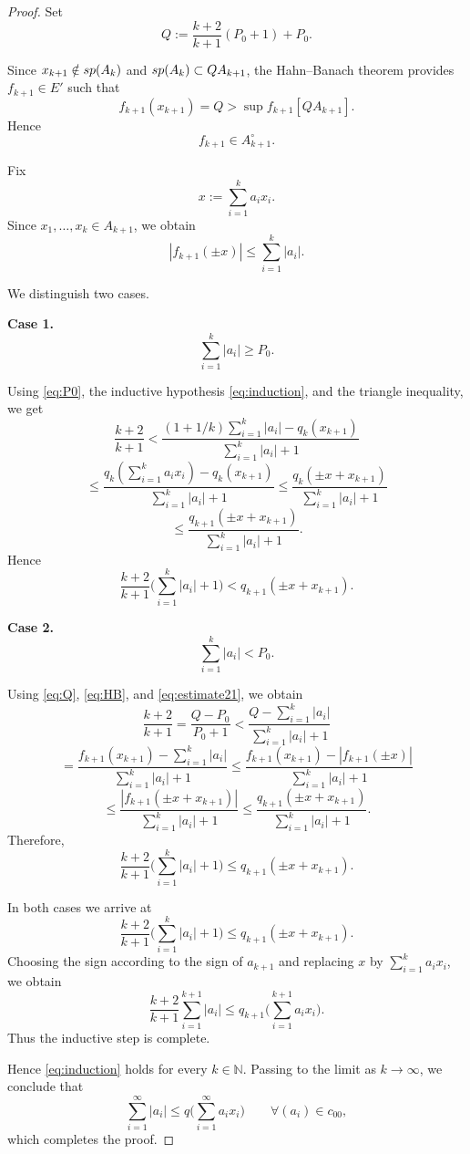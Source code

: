 \documentclass[10pt,a4paper]{amsart}
\begin{document}
\begin{proof}
Set
\begin{equation}\label{eq:Q}
Q:=
\frac{k+2}{k+1}(P_0+1)+P_0.
\end{equation}

Since
$x_{k+1}\notin {\rm sp}(A_k)$
and
${\rm sp}(A_k)\subset QA_{k+1}$,
the Hahn--Banach theorem provides
$f_{k+1}\in E'$
such that
\begin{equation}\label{eq:HB}
f_{k+1}(x_{k+1})=Q
>
\sup f_{k+1}[QA_{k+1}].
\end{equation}
Hence
\[
f_{k+1}\in A_{k+1}^\circ.
\]

Fix
\[
x:=\sum_{i=1}^{k}a_ix_i .
\]
Since
$x_1,\ldots,x_k\in A_{k+1}$,
we obtain
\begin{equation}\label{eq:estimate21}
|f_{k+1}(\pm x)|
\le
\sum_{i=1}^{k}|a_i|.
\end{equation}

We distinguish two cases.

\medskip

\noindent
{\bf Case 1.}
\[
\sum_{i=1}^{k}|a_i|\ge P_0.
\]

Using \eqref{eq:P0}, the inductive hypothesis
\eqref{eq:induction}, and the triangle inequality, we get
\[
\frac{k+2}{k+1}
<
\frac{(1+1/k)\sum_{i=1}^{k}|a_i|-q_k(x_{k+1})}
     {\sum_{i=1}^{k}|a_i|+1}
\]
\[
\le
\frac{
q_k\!\left(\sum_{i=1}^{k}a_ix_i\right)-q_k(x_{k+1})
}{
\sum_{i=1}^{k}|a_i|+1
}
\le
\frac{
q_k(\pm x+x_{k+1})
}{
\sum_{i=1}^{k}|a_i|+1
}
\]
\[
\le
\frac{
q_{k+1}(\pm x+x_{k+1})
}{
\sum_{i=1}^{k}|a_i|+1
}.
\]
Hence
\begin{equation}\label{eq:case1}
\frac{k+2}{k+1}
\Big(
\sum_{i=1}^{k}|a_i|+1
\Big)
<
q_{k+1}(\pm x+x_{k+1}).
\end{equation}

\medskip

\noindent
{\bf Case 2.}
\[
\sum_{i=1}^{k}|a_i|<P_0.
\]

Using \eqref{eq:Q}, \eqref{eq:HB}, and
\eqref{eq:estimate21}, we obtain
\[
\frac{k+2}{k+1}
=
\frac{Q-P_0}{P_0+1}
<
\frac{
Q-\sum_{i=1}^{k}|a_i|
}{
\sum_{i=1}^{k}|a_i|+1
}
\]
\[
=
\frac{
f_{k+1}(x_{k+1})
-\sum_{i=1}^{k}|a_i|
}{
\sum_{i=1}^{k}|a_i|+1
}
\le
\frac{
f_{k+1}(x_{k+1})
-|f_{k+1}(\pm x)|
}{
\sum_{i=1}^{k}|a_i|+1
}
\]
\[
\le
\frac{
|f_{k+1}(\pm x+x_{k+1})|
}{
\sum_{i=1}^{k}|a_i|+1
}
\le
\frac{
q_{k+1}(\pm x+x_{k+1})
}{
\sum_{i=1}^{k}|a_i|+1
}.
\]
Therefore,
\begin{equation}\label{eq:case2}
\frac{k+2}{k+1}
\Big(
\sum_{i=1}^{k}|a_i|+1
\Big)
\le
q_{k+1}(\pm x+x_{k+1}).
\end{equation}

\medskip

In both cases we arrive at
\[
\frac{k+2}{k+1}
\Big(
\sum_{i=1}^{k}|a_i|+1
\Big)
\le
q_{k+1}(\pm x+x_{k+1}).
\]
Choosing the sign according to the sign of $a_{k+1}$ and replacing
$x$ by $\sum_{i=1}^{k}a_ix_i$, we obtain
\[
\frac{k+2}{k+1}
\sum_{i=1}^{k+1}|a_i|
\le
q_{k+1}
\Big(
\sum_{i=1}^{k+1}a_ix_i
\Big).
\]
Thus the inductive step is complete.

Hence \eqref{eq:induction} holds for every $k\in\mathbb N$. Passing to the limit as $k\to\infty$, we conclude that
\[
\sum_{i=1}^{\infty}|a_i|
\le
q\Big(\sum_{i=1}^{\infty}a_ix_i\Big)
\qquad
\forall (a_i)\in c_{00},
\]
which completes the proof.
\end{proof}
\end{document}
